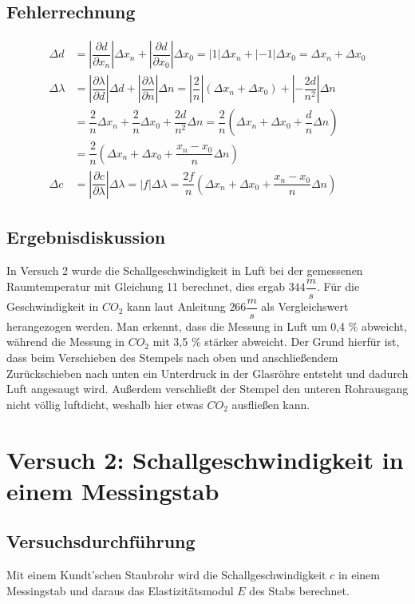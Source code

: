 \documentclass{scrartcl}
\begin{document}
\subsection{Fehlerrechnung}
\begin{align*}
\Delta d & = \left| \dfrac{\partial d}{\partial x_{n}} \right| \Delta x_{n} + \left| \dfrac{\partial d}{\partial x_{0}} \right| \Delta x_{0} = \left| 1 \right| \Delta x_{n} + \left| -1 \right| \Delta x_{0} = \Delta x_{n} + \Delta x_{0} \\
\Delta \lambda & = \left| \dfrac{\partial \lambda}{\partial d} \right| \Delta d + \left| \dfrac{\partial \lambda}{\partial n} \right| \Delta n = \left| \dfrac{2}{n} \right| (\Delta x_{n} + \Delta x_{0}) + \left| - \dfrac{2d}{n^2} \right| \Delta n \\
& = \dfrac{2}{n} \Delta x_{n} + \dfrac{2}{n} \Delta x_{0} + \dfrac{2d}{n^2} \Delta n = \dfrac{2}{n} (\Delta x_{n} + \Delta x_{0} + \dfrac{d}{n} \Delta n) \\
& = \dfrac{2}{n} (\Delta x_{n} + \Delta x_{0} + \dfrac{x_{n} - x_{0}}{n} \Delta n)\\
\Delta c & = \left| \dfrac{\partial c}{\partial \lambda} \right| \Delta \lambda = \left| f \right| \Delta \lambda = \dfrac{2f}{n} (\Delta x_{n} + \Delta x_{0} + \dfrac{x_{n} - x_{0}}{n} \Delta n)
\end{align*}
\subsection{Ergebnisdiskussion}
In Versuch 2 wurde die Schallgeschwindigkeit in Luft bei der gemessenen Raumtemperatur mit Gleichung 11 berechnet, dies ergab $344 \dfrac{m}{s}$.
Für die Geschwindigkeit in $CO_{2}$ kann laut Anleitung $266 \dfrac{m}{s}$ als Vergleichswert herangezogen werden.
Man erkennt, dass die Messung in Luft um 0,4 \% abweicht, während die Messung in $CO_{2}$ mit 3,5 \% stärker abweicht. Der Grund hierfür ist, dass beim Verschieben des Stempels nach oben und anschließendem Zurückschieben nach unten ein Unterdruck in der Glasröhre entsteht und dadurch Luft angesaugt wird. Außerdem verschließt der Stempel den unteren Rohrausgang nicht völlig luftdicht, weshalb hier etwas $CO_{2}$ ausfließen kann.
\section{Versuch 2: Schallgeschwindigkeit in einem Messingstab}
\subsection{Versuchsdurchführung}
Mit einem Kundt'schen Staubrohr wird die Schallgeschwindigkeit $c$ in einem Messingstab und daraus das Elastizitätsmodul $E$ des Stabs berechnet.
\end{document}
